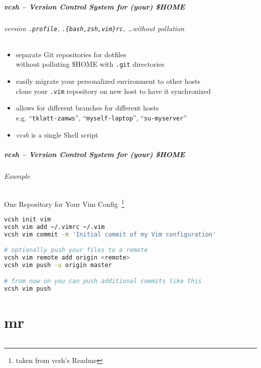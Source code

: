 \documentclass[english,hyperref={pdfpagelabels=false},aspectratio=169]{beamer}
\begin{document}
\begin{frame}[label=vcsh]
  \frametitle{vcsh -- Version Control System for (your) \$HOME}
  \framesubtitle{version \texttt{.profile}, \texttt{.\{bash,zsh,vim\}rc}, \dots without pollution}
  \begin{itemize}
    \item separate Git repositories for dotfiles\\
      {\scriptsize without polluting \$HOME with \texttt{.git} directories}
    \item easily migrate your personalized environment to other hosts\\
      {\scriptsize clone your \texttt{.vim} repository on new host to have it synchronized}
    \item allows for different branches for different hosts\\
      {\scriptsize e.g. ``\texttt{tklatt-zamws}'', ``\texttt{myself-laptop}'', ``\texttt{su-myserver}''}
    \item \textit{vcsh} is a single Shell script
  \end{itemize}
\end{frame}

\begin{frame}[fragile]
  \frametitle{vcsh -- Version Control System for (your) \$HOME}
  \framesubtitle{Example}
  \begin{block}{One Repository for Your Vim Config~\footnote{\tiny taken from vcsh's Readme}}
    \scriptsize
    \begin{lstlisting}[language=sh,basicstyle=\scriptsize\ttfamily,commentstyle=\normalfont\ttfamily\color{fzjgray50}]
vcsh init vim
vcsh vim add ~/.vimrc ~/.vim
vcsh vim commit -m 'Initial commit of my Vim configuration'

# optionally push your files to a remote
vcsh vim remote add origin <remote>
vcsh vim push -u origin master

# from now on you can push additional commits like this
vcsh vim push
    \end{lstlisting}
  \end{block}
\end{frame}


\part{mr}
\makepart

\begin{frame}[label=mr]
  \frametitle{}
  \framesubtitle{}
  
\end{frame}
\end{document}

